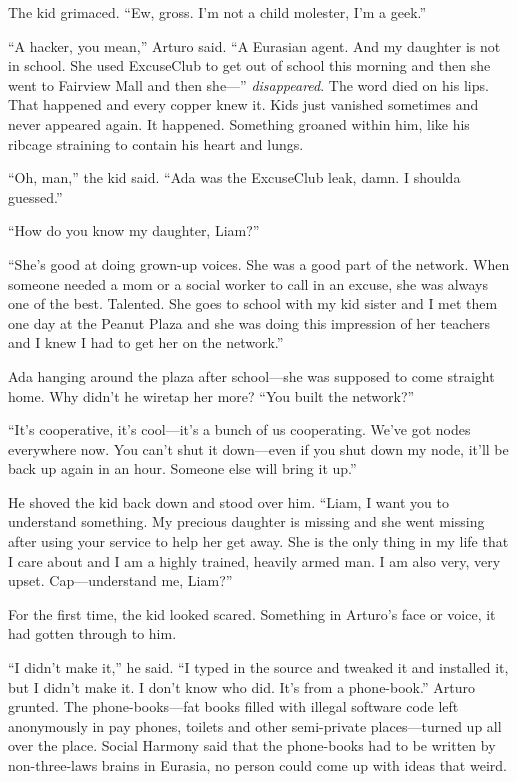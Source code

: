 The kid grimaced. “Ew, gross. I’m not a child molester, I’m a
geek.”

“A hacker, you mean,” Arturo said. “A Eurasian agent. And my
daughter is not in school. She used ExcuseClub to get out of school
this morning and then she went to Fairview Mall and then she—”
\emph{disappeared}. The word died on his lips. That happened and
every copper knew it. Kids just vanished sometimes and never
appeared again. It happened. Something groaned within him, like his
ribcage straining to contain his heart and lungs.

“Oh, man,” the kid said. “Ada was the ExcuseClub leak, damn. I
shoulda guessed.”

“How do you know my daughter, Liam?”

“She’s good at doing grown-up voices. She was a good part of the
network. When someone needed a mom or a social worker to call in an
excuse, she was always one of the best. Talented. She goes to
school with my kid sister and I met them one day at the Peanut
Plaza and she was doing this impression of her teachers and I knew
I had to get her on the network.”

Ada hanging around the plaza after school—she was supposed to come
straight home. Why didn’t he wiretap her more? “You built the
network?”

“It’s cooperative, it’s cool—it’s a bunch of us cooperating. We’ve
got nodes everywhere now. You can’t shut it down—even if you shut
down my node, it’ll be back up again in an hour. Someone else will
bring it up.”

He shoved the kid back down and stood over him. “Liam, I want you
to understand something. My precious daughter is missing and she
went missing after using your service to help her get away. She is
the only thing in my life that I care about and I am a highly
trained, heavily armed man. I am also very, very upset.
Cap—understand me, Liam?”

For the first time, the kid looked scared. Something in Arturo’s
face or voice, it had gotten through to him.

“I didn’t make it,” he said. “I typed in the source and tweaked it
and installed it, but I didn’t make it. I don’t know who did. It’s
from a phone-book.” Arturo grunted. The phone-books—fat books
filled with illegal software code left anonymously in pay phones,
toilets and other semi-private places—turned up all over the place.
Social Harmony said that the phone-books had to be written by
non-three-laws brains in Eurasia, no person could come up with
ideas that weird.

